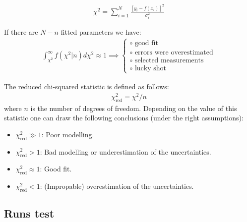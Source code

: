 {    	\begin{formula}
		\begin{gather}
			\label{statistics:gof:chi_square}
	                \chi^2 = \sum_{i=1}^N\frac{\left[y_i - f\left(x_i\right)\right]^2}{\sigma_i^2}
		\end{gather}
	\end{formula}
        \begin{property}
        	If there are $N - n$ fitted parameters we have:
		\begin{gather}
			\label{statistics:gof:chance_for_chi_square}
                	\int_{\chi^2}^\infty f\left(\chi^2|n\right)d\chi^2 \approx 1\implies
	                \begin{cases}
				\circ\text{ good fit}\\
	                	\circ\text{ errors were overestimated}\\
	                	\circ\text{ selected measurements}\\
	                	\circ\text{ lucky shot}
        	        \end{cases}
		\end{gather}
	\end{property}
        \begin{property}
		The reduced chi-squared statistic is defined as follows:
		\begin{gather}
			\chi^2_{\text{red}} = \chi^2/n
		\end{gather}
		where $n$ is the number of degrees of freedom. Depending on the value of this statistic one can draw the following conclusions (under the right assumptions):
		\begin{itemize}
                	\item $\chi^2_{\text{red}} \gg 1$: Poor modelling.
                	\item $\chi^2_{\text{red}} > 1$: Bad modelling or underestimation of the uncertainties.
                	\item $\chi^2_{\text{red}} \approx 1$: Good fit.
                	\item $\chi^2_{\text{red}} < 1$: (Impropable) overestimation of the uncertainties. 
		\end{itemize}
	\end{property}
    
\subsection{Runs test}
	
}
